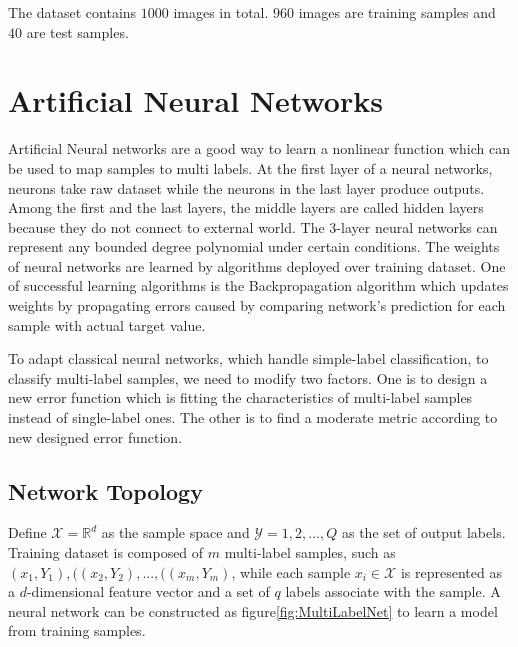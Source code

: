 The dataset contains $1000$ images in total. $960$ images are training samples and $40$ are test samples. 

\section{Artificial Neural Networks}

Artificial Neural networks are a good way to learn a nonlinear function which can be used to map samples to multi labels. At the first layer of a neural networks, neurons take raw dataset while the neurons in the last layer produce outputs. Among the first and the last layers, the middle layers are called hidden layers because they do not connect to external world. The 3-layer neural networks can represent any bounded degree polynomial under certain conditions\citep{barron1993universal}. The weights of neural networks are learned by algorithms deployed over training dataset. One of successful learning algorithms is the Backpropagation algorithm which updates weights by propagating errors caused by comparing network's prediction for each sample with actual target value.

To adapt classical neural networks, which handle simple-label classification, to classify multi-label samples, we need to modify two factors. One is to design a new error function which is fitting the characteristics of multi-label samples instead of single-label ones. The other is to find a moderate metric according to new designed error function.

\subsection{Network Topology}

Define $\mathcal{X} = \mathbb{R}^{d}$ as the sample space and $\mathcal{Y} = {1,2,...,Q}$ as the set of output labels. Training dataset is composed of $m$ multi-label samples, such as ${(x_{1}, Y_{1}),((x_{2}, Y_{2}),...,((x_{m}, Y_{m})}$, while each sample $x_{i} \in \mathcal{X}$ is represented as a $d$-dimensional feature vector and a set of $q$ labels associate with the sample. A neural network can be constructed as figure\ref{fig:MultiLabelNet} to learn a model from training samples.

